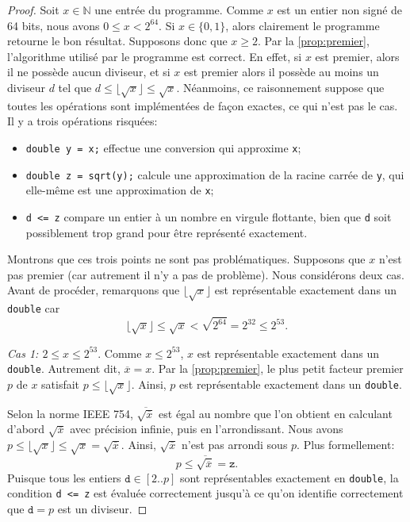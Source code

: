 \documentclass{article}
\newcommand{\N}{\mathbb{N}}
\begin{document}
\begin{proof}
  Soit $x \in \N$ une entrée du programme. Comme $x$ est un entier non
  signé de 64 bits, nous avons $0 \leq x < 2^{64}$. Si $x \in \{0,
  1\}$, alors clairement le programme retourne le bon
  résultat. Supposons donc que $x \geq 2$. Par la \cref{prop:premier},
  l'algorithme utilisé par le programme est correct. En effet, si $x$
  est premier, alors il ne possède aucun diviseur, et si $x$ est
  premier alors il possède au moins un diviseur $d$ tel que $d \leq
  \lfloor \sqrt{x} \rfloor \leq \sqrt{x}$. Néanmoins, ce raisonnement
  suppose que toutes les opérations sont implémentées de façon
  exactes, ce qui n'est pas le cas. Il y a trois opérations risquées:

  \smallskip
  \begin{itemize}
    \setlength\itemsep{3pt}
    
  \item \og \texttt{double y = x;} \fg{} effectue une
    conversion qui approxime \texttt{x};

  \item \og \texttt{double z = sqrt(y);} \fg{} calcule une
    approximation de la racine carrée de \texttt{y}, qui elle-même est
    une approximation de \texttt{x};

  \item \og \texttt{d <= z} \fg{} compare un entier à un
    nombre en virgule flottante, bien que \texttt{d} soit possiblement
    trop grand pour être représenté exactement.
  \end{itemize}
  \smallskip

  Montrons que ces trois points ne sont pas problématiques. Supposons
  que $x$ n'est pas premier (car autrement il n'y a pas de
  problème). Nous considérons deux cas. Avant de procéder, remarquons
  que $\lfloor\sqrt{x}\rfloor$ est représentable exactement dans un
  \texttt{double} car
  \[
  \lfloor\sqrt{x}\rfloor
  \leq \sqrt{x}
  < \sqrt{2^{64}}
  = 2^{32}
  \leq 2^{53}.
  \]

  \medskip\noindent\emph{Cas 1: $2 \leq x \leq 2^{53}$}. Comme $x \leq
  2^{53}$, $x$ est représentable exactement dans un
  \texttt{double}. Autrement dit, $\overline{x} = x$. Par la
  \cref{prop:premier}, le plus petit facteur premier $p$ de $x$
  satisfait $p \leq \lfloor \sqrt{x} \rfloor$. Ainsi, $p$ est
  représentable exactement dans un \texttt{double}.

  Selon la norme IEEE 754, $\overline{\sqrt{\overline{x}}}$ est égal
  au nombre que l'on obtient en calculant d'abord
  $\sqrt{\overline{x}}$ avec précision infinie, puis en
  l'arrondissant. Nous avons $p \leq \lfloor \sqrt{x} \rfloor \leq
  \sqrt{x} = \sqrt{\overline{x}}$. Ainsi, $\sqrt{\overline{x}}$ n'est
  pas arrondi sous $p$. Plus formellement:
  \[
  p \leq \overline{\sqrt{\overline{x}}} = \texttt{z}.
  \]
  Puisque tous les entiers $\texttt{d} \in [2..p]$ sont représentables
  exactement en \texttt{double}, la condition \og
  \texttt{d <= z} \fg{} est évaluée correctement jusqu'à ce
  qu'on identifie correctement que $\texttt{d} = p$ est un diviseur.


\end{proof}
\end{document}
